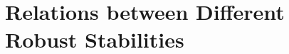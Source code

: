 \documentclass[11pt,onecolumn]{article}
\newcommand{\one}{\mathbf{1}}
\begin{document}















\section{Relations between Different Robust Stabilities}\label{SubSecRelations}



%
\end{document}
